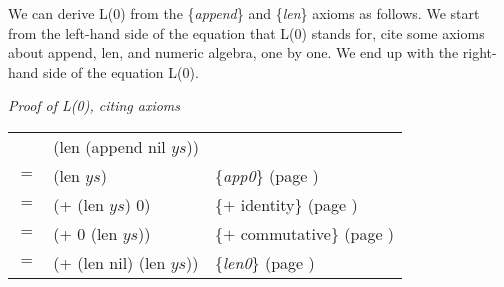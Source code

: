 
We can derive L(0) from the \{\emph{append}\} and \{\emph{len}\} axioms as follows.
We start from the left-hand side of the equation that L(0) stands for,
cite some axioms about \textsf{append}, \textsf{len}, and numeric algebra,
one by one. We end up with the right-hand side of the equation L(0).

\begin{center}
\emph{Proof of L(0), citing axioms} \\
\begin{tabular}{lll}
\hline
    & \textsf{(len (append nil $ys$))}  &                                                \\
$=$ & \textsf{(len $ys$)}               & \{\emph{app0}\}     (page \pageref{append-equations})\\
$=$ & \textsf{(+ (len $ys$) 0)}         & \{$+$ identity\}    (page \pageref{fig-02-01}) \\
$=$ & \textsf{(+ 0 (len $ys$))}         & \{$+$ commutative\} (page \pageref{fig-02-01}) \\
$=$ & \textsf{(+ (len nil) (len $ys$))} & \{\emph{len0}\}     (page \pageref{len-equations})
\end{tabular}
\end{center}

